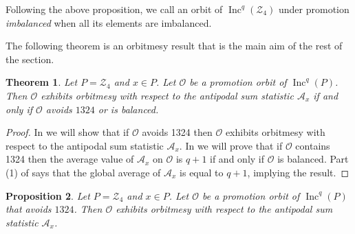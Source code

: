 \documentclass[11pt]{amsart}
\newtheorem{theorem}{Theorem}[section]
\newtheorem{proposition}[theorem]{Proposition}
\theoremstyle{definition}
\newcommand{\as}{\mathcal{A}}
\DeclareMathOperator{\Inc}{\mathrm{Inc}}
\newcommand{\calZ}{\mathcal{Z}}
\begin{document}
Following the above proposition, we call an orbit of $\Inc^q(\calZ_4)$ under  promotion \emph{imbalanced} when all its elements are imbalanced.


The following theorem is an orbitmesy result that is the main aim of the rest of the section.
\begin{theorem}\label{thm:near-homomesy}
    Let $P=\calZ_4$ and $x\in P$. Let $\mathcal{O}$ be a promotion orbit of $\Inc^q(P)$. Then $\mathcal{O}$ exhibits orbitmesy with respect to the antipodal sum statistic $\as_x$ if and only if $\mathcal{O}$ avoids $1324$ or is balanced. 
\end{theorem}

\begin{proof}
    In  we will show that if $\mathcal{O}$ avoids 1324 then $\mathcal{O}$ exhibits orbitmesy with respect to the antipodal sum statistic $\as_x$.  In  we will prove that if $\mathcal{O}$ contains 1324 then the average value of $\as_x$ on $\mathcal{O}$ is $q+1$ if and only if $\mathcal{O}$ is balanced.  Part (1) of  says that the global average of $\as_x$ is equal to $q+1$, implying the result.
\end{proof}

\begin{proposition}\label{thm:near-homomesy-ABD}
    Let $P=\calZ_4$ and $x\in P$. Let $\mathcal{O}$ be a promotion orbit of $\Inc^q(P)$ that avoids $1324$. Then $\mathcal{O}$ exhibits orbitmesy with respect to the antipodal sum statistic $\as_x$.
\end{proposition}
\end{document}

